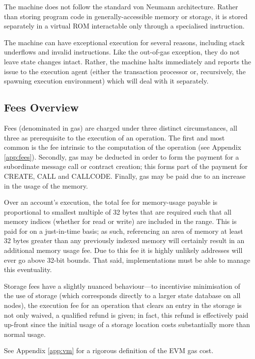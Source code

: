 \documentclass[9pt,oneside]{amsart}
\begin{document}
\begin{multicols}{2}
The machine does not follow the standard von Neumann architecture. Rather than storing program code in generally-accessible memory or storage, it is stored separately in a virtual ROM interactable only through a specialised instruction.

The machine can have exceptional execution for several reasons, including stack underflows and invalid instructions. Like the out-of-gas exception, they do not leave state changes intact. Rather, the machine halts immediately and reports the issue to the execution agent (either the transaction processor or, recursively, the spawning execution environment) which will deal with it separately.

\subsection{Fees Overview}

Fees (denominated in gas) are charged under three distinct circumstances, all three as prerequisite to the execution of an operation. The first and most common is the fee intrinsic to the computation of the operation (see Appendix \ref{app:fees}). Secondly, gas may be deducted in order to form the payment for a subordinate message call or contract creation; this forms part of the payment for {\small CREATE}, {\small CALL} and {\small CALLCODE}. Finally, gas may be paid due to an increase in the usage of the memory.

Over an account's execution, the total fee for memory-usage payable is proportional to smallest multiple of 32 bytes that are required such that all memory indices (whether for read or write) are included in the range. This is paid for on a just-in-time basis; as such, referencing an area of memory at least 32 bytes greater than any previously indexed memory will certainly result in an additional memory usage fee. Due to this fee it is highly unlikely addresses will ever go above 32-bit bounds. That said, implementations must be able to manage this eventuality.

Storage fees have a slightly nuanced behaviour---to incentivise minimisation of the use of storage (which corresponds directly to a larger state database on all nodes), the execution fee for an operation that clears an entry in the storage is not only waived, a qualified refund is given; in fact, this refund is effectively paid up-front since the initial usage of a storage location costs substantially more than normal usage.

See Appendix \ref{app:vm} for a rigorous definition of the EVM gas cost.


\end{multicols}
\end{document}
